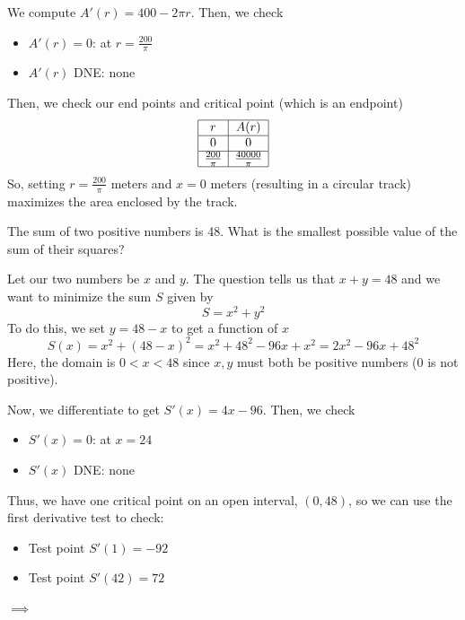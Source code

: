 \documentclass[11pt]{exam}
\begin{document}
\begin{questions}
\begin{solution}
\begin{enumerate}[(a)]
    We compute \(A'(r) = 400-2\pi r\). Then, we check
    \begin{itemize}
    \item \(A'(r) = 0\): at \(r = \frac{200}{\pi}\)
    \item \(A'(r)\) DNE: none
    \end{itemize}
    Then, we check our end points and critical point (which is an
    endpoint) \[
   \begin{array}{|c|c|}
        \hline
        r & A(r)\\
        \hline
        0 & 0\\
        \hline
        \frac{200}{\pi} & \frac{40000}{\pi}\\
        \hline
      \end{array}
    \]
    So, setting \(r = \frac{200}{\pi}\) meters and \(x = 0\) meters
    (resulting in a circular track) maximizes the area enclosed by the track.
  \end{enumerate}
\end{solution}
\question The sum of two positive numbers is 48. What is the smallest possible value of the sum of their squares?
  \begin{solution}
    Let our two numbers be \(x\) and \(y\). The question tells us that
    \(x+y=48\) and we want to minimize the sum \(S\) given by \[
      S = x^2+y^2
    \]
    To do this, we set \(y = 48-x\) to get a function of \(x\) \[
      S(x) = x^2 + (48-x)^2 = x^2 + 48^2 - 96x + x^2 = 2x^2-96x+48^2
    \]
    Here, the domain is \(0 < x < 48\) since \(x,y\) must both be
    positive numbers (\(0\) is not positive).

    Now, we differentiate to
    get \(S'(x) = 4x-96\). Then, we check
    \begin{itemize}
    \item \(S'(x) = 0\): at \(x = 24\)
    \item \(S'(x)\) DNE: none
    \end{itemize}
    Thus, we have one critical point on an open interval, \((0,48)\),
    so we can use the first derivative test to check:
    \begin{itemize}
    \item Test point \(S'(1) = -92\)
    \item Test point \(S'(42) = 72\)
    \end{itemize}
    \(\implies\)


\end{solution}
\end{questions}
\end{document}
